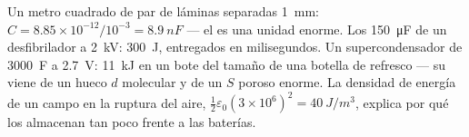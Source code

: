 \begin{example}\label{ex:b1:potential-capacitors:energies}
Un metro cuadrado de par de láminas separadas \qty{1}{mm}: $C = 8.85 \times 10^{-12}/
10^{-3} = \qty{8.9}{nF}$ --- el  es una unidad enorme. Los
\qty{150}{\micro F} de un desfibrilador a \qty{2}{kV}: \qty{300}{J},
entregados en milisegundos. Un supercondensador de \qty{3000}{F} a
\qty{2.7}{V}: \qty{11}{kJ} en un bote del tamaño de una botella de
refresco --- su  viene de un hueco $d$ molecular y de un $S$
poroso enorme. La densidad de energía de un campo en la ruptura del aire,
$\tfrac12\varepsilon_0(3 \times 10^6)^2 = \qty{40}{J/m^3}$, explica por qué los
 almacenan tan poco frente a las baterías.
\end{example}

